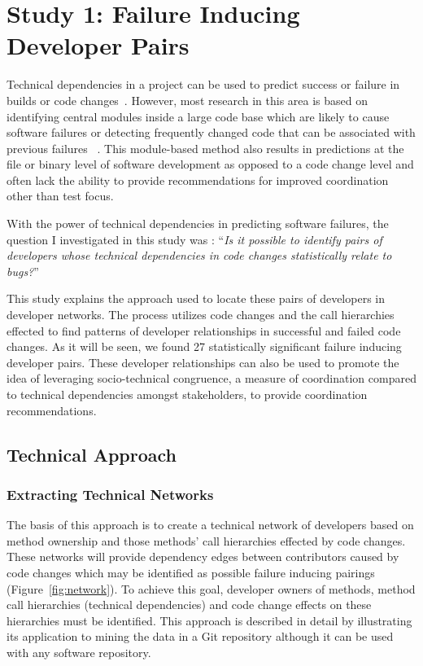 \section{Study 1: Failure Inducing Developer Pairs}
\label{study:pairs}

Technical dependencies in a project can be used to predict success or failure in
 builds or code changes~\cite{Pinzger:2008:DNP, Zimmermann:2008:PDU}. However, most 
research in this area is based on identifying
central modules inside a large code base which are likely to cause software failures or
detecting frequently changed code that can be associated with previous failures
~\cite{Kim:2006:AIB}. 
This module-based method also results in predictions 
at the file or binary level of software development as opposed to a code change level
and often lack the ability to provide recommendations for improved coordination
other than test focus.

With the power of technical dependencies in predicting software failures, the question I
investigated in this study was : 
``\textit{Is it possible to identify pairs of developers whose technical dependencies in code changes
statistically relate to bugs?}''

This study explains the approach used to locate these pairs of developers in developer networks.
The process utilizes code changes and the call hierarchies effected  to find patterns of developer 
relationships in successful and failed code changes. As it will be seen, we found 27 statistically
significant failure inducing developer pairs. These developer relationships can also be used
to promote the idea of leveraging socio-technical congruence, a measure of coordination compared
to technical dependencies amongst stakeholders, to provide coordination recommendations.

\subsection{Technical Approach}

\subsubsection{Extracting Technical Networks}
The basis of this approach is to create a technical network of developers based on method ownership
and those methods' call hierarchies effected by code changes. These networks will provide
dependency edges between contributors caused by code changes which may be 
identified as possible failure inducing pairings (Figure~\ref{fig:network}). To achieve this goal,
developer owners of methods, method call hierarchies (technical
dependencies) and code change effects on these hierarchies must be identified.
This approach is described in detail by illustrating its application to mining the data in a Git
repository although it can be used with any software repository.

